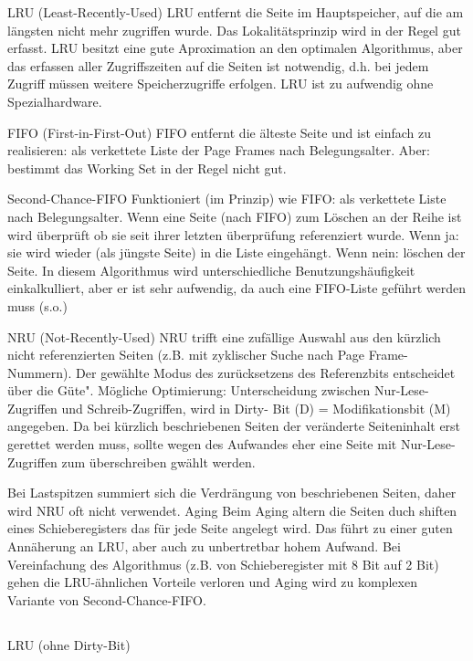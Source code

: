\begin{answer}
LRU (Least-Recently-Used)
LRU entfernt die Seite im Hauptspeicher, auf die am längsten nicht mehr zugriffen
wurde. Das Lokalitätsprinzip wird in der Regel gut erfasst. LRU besitzt eine gute
Aproximation an den optimalen Algorithmus,
aber das erfassen aller Zugriffszeiten auf die Seiten ist notwendig, d.h. bei jedem
Zugriff müssen weitere Speicherzugriffe erfolgen. LRU ist zu aufwendig ohne Spezialhardware.

FIFO (First-in-First-Out)
FIFO entfernt die älteste Seite und ist einfach zu realisieren: als verkettete Liste der
Page Frames nach Belegungsalter.
Aber: bestimmt das Working Set in der Regel nicht gut.

Second-Chance-FIFO
Funktioniert (im Prinzip) wie FIFO: als verkettete Liste nach Belegungsalter. Wenn
eine Seite (nach FIFO) zum Löschen an der Reihe ist wird überprüft ob sie seit
ihrer letzten überprüfung referenziert wurde. Wenn ja: sie wird wieder (als jüngste
Seite) in die Liste eingehängt. Wenn nein: löschen der Seite.
In diesem Algorithmus wird unterschiedliche Benutzungshäufigkeit einkalkulliert,
aber er ist sehr aufwendig, da auch eine FIFO-Liste geführt werden muss (s.o.)

NRU (Not-Recently-Used)
NRU trifft eine zufällige Auswahl aus den kürzlich nicht referenzierten Seiten (z.B.
mit zyklischer Suche nach Page Frame-Nummern). Der gewählte Modus des zurücksetzens
des Referenzbits entscheidet über die Güte".
Mögliche Optimierung:
Unterscheidung zwischen Nur-Lese-Zugriffen und Schreib-Zugriffen, wird in Dirty-
Bit (D) = Modifikationsbit (M) angegeben.
Da bei kürzlich beschriebenen Seiten der veränderte Seiteninhalt erst gerettet werden
muss, sollte wegen des Aufwandes eher eine Seite mit Nur-Lese-Zugriffen zum
überschreiben gwählt werden.

Bei Lastspitzen summiert sich die Verdrängung von beschriebenen Seiten, daher
wird NRU oft nicht verwendet.
Aging
Beim Aging altern die Seiten duch shiften eines Schieberegisters das für jede Seite
angelegt wird. Das führt zu einer guten Annäherung an LRU, aber auch zu unbertretbar
hohem Aufwand. Bei Vereinfachung des Algorithmus (z.B. von Schieberegister
mit 8 Bit auf 2 Bit) gehen die LRU-ähnlichen Vorteile verloren und Aging wird
zu komplexen Variante von Second-Chance-FIFO.
\end{answer}

\subsection{}
\begin{answer}
LRU (ohne Dirty-Bit)
\end{answer}

